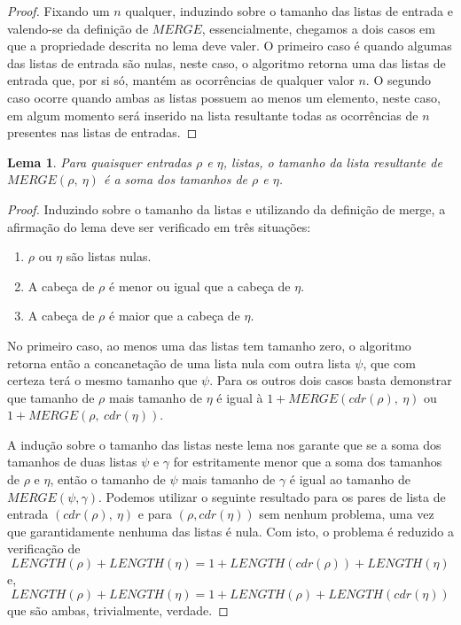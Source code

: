 \documentclass[12pt]{article}
\newtheorem{lemma}[theorem]{Lema}
\theoremstyle{definition}
\begin{document}
\begin{proof}
        Fixando um $n$ qualquer, induzindo sobre o tamanho das listas de entrada e valendo-se da definição de $MERGE$, essencialmente,
        chegamos a dois casos em que a propriedade descrita no lema deve valer. O primeiro caso é quando algumas das listas de
        entrada são nulas, neste caso, o algoritmo retorna uma das listas de entrada que, por si só, mantém as ocorrências de
        qualquer valor $n$. O segundo caso ocorre quando ambas as listas possuem ao menos um elemento, neste caso, em algum momento será inserido
        na lista resultante todas as ocorrências de $n$ presentes nas listas de entradas.
\end{proof}

\begin{lemma}
\label{merge-preserves-length}
        Para quaisquer entradas $\rho$ e $\eta$, listas, o tamanho da lista resultante de $MERGE(\rho,\ \eta)$ é a soma
        dos tamanhos de $\rho$ e $\eta$.
\end{lemma}

\begin{proof}
        Induzindo sobre o tamanho da listas e utilizando da definição de merge, a afirmação do
        lema deve ser verificado em três situações:
        \begin{enumerate}
                \item $\rho$ ou $\eta$ são listas nulas.
                \item A cabeça de $\rho$ é menor ou igual que a cabeça de $\eta$.
                \item A cabeça de $\rho$ é maior que a cabeça de $\eta$.
        \end{enumerate}

        No primeiro caso, ao menos uma das listas tem tamanho zero, o algoritmo retorna então a concanetação de uma
        lista nula com outra lista $\psi$, que com certeza terá o mesmo tamanho que $\psi$. Para os outros dois casos
        basta demonstrar que tamanho de $\rho$ mais tamanho de $\eta$ é igual à $1 + MERGE(cdr(\rho),\ \eta)$ ou
        $1 + MERGE(\rho,\ cdr(\eta))$. 

        A indução sobre o tamanho das listas neste lema nos garante que se a soma dos tamanhos de duas listas $\psi$ e $\gamma$ 
        for estritamente menor que a soma dos tamanhos de $\rho$ e $\eta$, então o tamanho de $\psi$ mais tamanho de $\gamma$ é igual ao tamanho
        de $MERGE(\psi, \gamma)$. Podemos utilizar o seguinte resultado para os pares de lista de entrada $(cdr(\rho),\ \eta)$ 
        e para $(\rho, cdr(\eta))$ sem nenhum problema, uma vez que garantidamente nenhuma das listas é nula. Com isto, o problema
        é reduzido a verificação de
        \begin{equation*}
                LENGTH(\rho) + LENGTH(\eta) = 1 + LENGTH(cdr(\rho)) + LENGTH(\eta)
        \end{equation*}
        e,
        \begin{equation*}
                LENGTH(\rho) + LENGTH(\eta) = 1 + LENGTH(\rho) + LENGTH(cdr(\eta))
        \end{equation*}
        que são ambas, trivialmente, verdade.
\end{proof}
\end{document}
